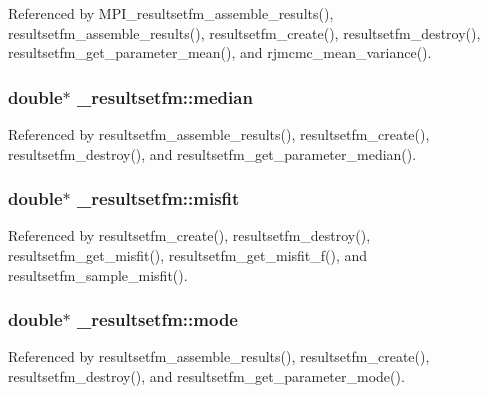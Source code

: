 Referenced by M\+P\+I\+\_\+resultsetfm\+\_\+assemble\+\_\+results(), resultsetfm\+\_\+assemble\+\_\+results(), resultsetfm\+\_\+create(), resultsetfm\+\_\+destroy(), resultsetfm\+\_\+get\+\_\+parameter\+\_\+mean(), and rjmcmc\+\_\+mean\+\_\+variance().

\subsubsection[{\texorpdfstring{median}{median}}]{\setlength{\rightskip}{0pt plus 5cm}double$\ast$ \+\_\+resultsetfm\+::median}\hypertarget{struct__resultsetfm_a708c5f40ab8ed4084a94fc60daef5c44}{}\label{struct__resultsetfm_a708c5f40ab8ed4084a94fc60daef5c44}


Referenced by resultsetfm\+\_\+assemble\+\_\+results(), resultsetfm\+\_\+create(), resultsetfm\+\_\+destroy(), and resultsetfm\+\_\+get\+\_\+parameter\+\_\+median().

\subsubsection[{\texorpdfstring{misfit}{misfit}}]{\setlength{\rightskip}{0pt plus 5cm}double$\ast$ \+\_\+resultsetfm\+::misfit}\hypertarget{struct__resultsetfm_a3032beb7c94f1f86484799c3e916fb0a}{}\label{struct__resultsetfm_a3032beb7c94f1f86484799c3e916fb0a}


Referenced by resultsetfm\+\_\+create(), resultsetfm\+\_\+destroy(), resultsetfm\+\_\+get\+\_\+misfit(), resultsetfm\+\_\+get\+\_\+misfit\+\_\+f(), and resultsetfm\+\_\+sample\+\_\+misfit().

\subsubsection[{\texorpdfstring{mode}{mode}}]{\setlength{\rightskip}{0pt plus 5cm}double$\ast$ \+\_\+resultsetfm\+::mode}\hypertarget{struct__resultsetfm_a9e05b752653c91742d5e9891df70fbec}{}\label{struct__resultsetfm_a9e05b752653c91742d5e9891df70fbec}


Referenced by resultsetfm\+\_\+assemble\+\_\+results(), resultsetfm\+\_\+create(), resultsetfm\+\_\+destroy(), and resultsetfm\+\_\+get\+\_\+parameter\+\_\+mode().


